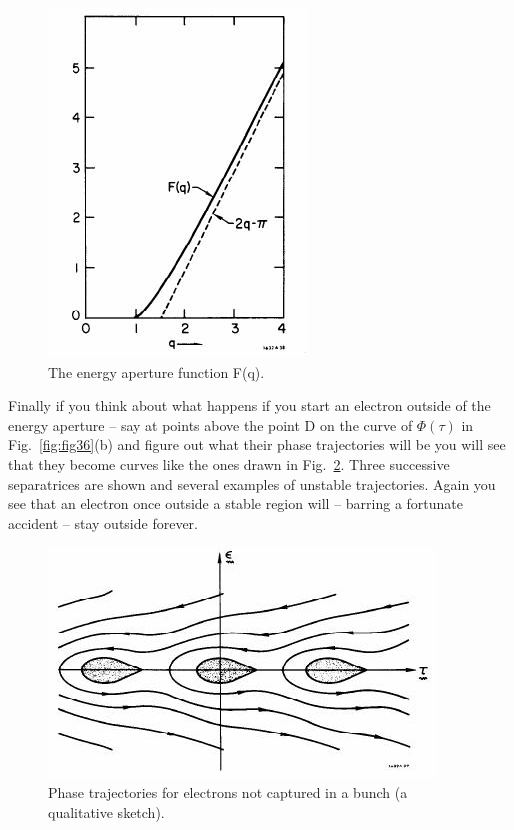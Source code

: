 \begin{figure}[!htb]
	\centering
	\includegraphics[width=0.5\linewidth]{./Figuras/fig38.jpeg}
	\caption{The energy aperture function F(q).}
	\label{fig:fig38}
\end{figure}

Finally if you think about what happens if you start an electron outside of the energy aperture
 -- say at points above the point D on the curve of $\Phi(\tau)$ in Fig.~\ref{fig:fig36}(b)
and figure out what their phase trajectories will be you will see that they become curves like the ones drawn in Fig.~\ref{fig:fig39}. Three successive separatrices are shown and several examples of unstable trajectories. Again you see that an electron once outside a stable region will -- barring a fortunate accident -- stay outside forever.

\begin{figure}[!htb]
	\centering
	\includegraphics[width=0.8\linewidth]{./Figuras/fig39.jpeg}
	\caption{Phase trajectories for electrons not captured in a bunch (a qualitative sketch).}
	\label{fig:fig39}
\end{figure}


